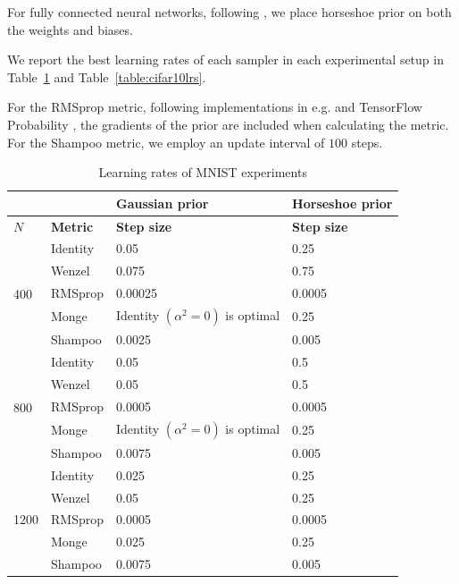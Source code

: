 \documentclass[10pt]{article} %
\theoremstyle{plain}
\theoremstyle{definition}
\theoremstyle{remark}
\begin{document}
For fully connected neural networks, following \citet{Ghosh2019}, we place horseshoe prior on both the weights and biases.

We report the best learning rates of each sampler in each experimental setup in Table~\ref{table:mnistlrs} and Table~\ref{table:cifar10lrs}.

For the RMSprop metric, following implementations in e.g. \citet{Fortuin2021} and TensorFlow Probability \citep{Dillon2017}, the gradients of the prior are included when calculating the metric. For the Shampoo metric, we employ an update interval of $100$ steps.


\begin{table}[t]
\begin{center}
\begin{tabular}{ll|l|l}
 & & Gaussian prior &
 Horseshoe prior \\
\hline
$N$ & {\bf Metric}                   & {\bf Step size}
& {\bf Step size} \\
\hline
\multirow{5}{1em}{400} & 
Identity & 0.05 & 0.25 \\
& Wenzel  & 0.075 & 0.75 \\
& RMSprop & 0.00025 & 0.0005 \\
& Monge   
& Identity $(\alpha^{2}=0)$ is optimal & 0.25 \\
& Shampoo & 0.0025 & 0.005 \\
\hline
\multirow{5}{1em}{800} & 
Identity & 0.05 & 0.5 \\
& Wenzel  & 0.05 & 0.5 \\
& RMSprop & 0.0005 & 0.0005 \\
& Monge   & Identity $(\alpha^{2}=0)$ is optimal & 0.25 \\
& Shampoo & 0.0075 & 0.005 \\
\hline
\multirow{5}{1em}{1200} & 
Identity & 0.025 & 0.25 \\
& Wenzel & 0.05 & 0.25 \\
& RMSprop & 0.0005 & 0.0005 \\
& Monge   & 0.025 & 0.25 \\
& Shampoo & 0.0075 & 0.005\\
\hline
\end{tabular}
\caption{Learning rates of MNIST experiments}
\label{table:mnistlrs}
\end{center}
\end{table}
\end{document}
